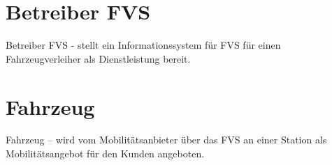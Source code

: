 
\section*{Betreiber FVS}
Betreiber FVS - stellt ein Informationssystem für FVS für einen Fahrzeugverleiher als Dienstleistung bereit.


%
%
%
\section*{Fahrzeug}

Fahrzeug – wird vom Mobilitätsanbieter über das FVS an einer Station als Mobilitätsangebot für den Kunden angeboten.

